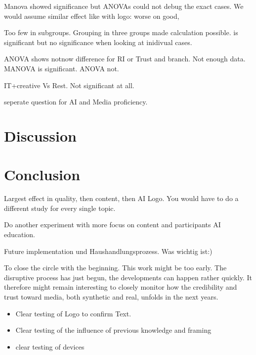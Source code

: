 \documentclass[
  a4paper,  %
  twoside,  %
  bibliography=totoc,
  headsepline,
  cleardoublepage=empty,
  parskip=half,
  draft=false
]{scrbook}
\begin{document}
Manova showed significance but ANOVAs could not debug the exact cases.
We would assume similar effect like with logo: 
worse on good, 

Too few in subgroups. 
Grouping in three groups made calculation possible. is significant but no significance when looking at inidivual cases.

ANOVA shows notnow difference for RI or Trust and branch. Not enough data. 
MANOVA is significant. 
ANOVA not. 

IT+creative Vs Rest. Not significant at all.

seperate question for AI and Media proficiency.

\chapter{Discussion}

\chapter{Conclusion}
\label{sec:conclusion}

Largest effect in quality, then content, then AI Logo.
You would have to do a different study for every single topic. 


Do another experiment with more focus on content and participants AI education. 

Future implementation und Haushandlungsprozess. Was wichtig ist:) 

To close the circle with the beginning. This work might be too early. The disruptive process has just begun, the developments can happen rather quickly. It therefore might remain interesting to closely monitor how the credibility and trust toward media, both synthetic and real, unfolds in the next years. 

\begin{itemize}
  \item Clear testing of Logo to confirm Text.
  \item Clear testing of the influence of previous knowledge and framing
  \item clear testing of devices
\end{itemize}
\end{document}
